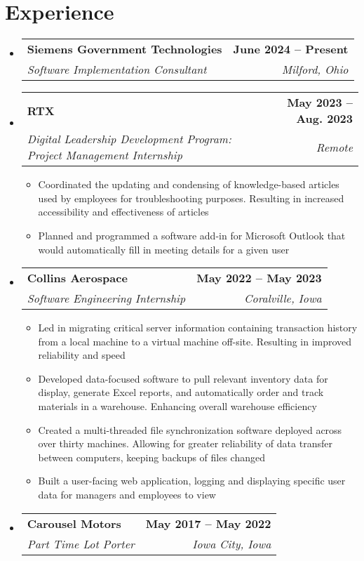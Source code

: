 \documentclass[letterpaper,11pt]{article}
\makeatletter
\newcommand{\resumeItem}[1]{
  \item\small{
    {#1 \vspace{-2pt}}
  }
}
\newcommand{\resumeSubheading}[4]{
  \vspace{-2pt}\item
    \begin{tabular*}{1.0\textwidth}[t]{l@{\extracolsep{\fill}}r}
      \textbf{#1} & \textbf{\small #2} \\
      \textit{\small#3} & \textit{\small #4} \\
    \end{tabular*}\vspace{-7pt}
}
\newcommand{\resumeSubHeadingListStart}{\begin{itemize}[leftmargin=0.0in, label={}]}
\newcommand{\resumeSubHeadingListEnd}{\end{itemize}}
\newcommand{\resumeItemListStart}{\begin{itemize}}
\newcommand{\resumeItemListEnd}{\end{itemize}\vspace{-5pt}}
\makeatother
\begin{document}
\section{Experience}
 \vspace{2pt}
  \resumeSubHeadingListStart
  \resumeSubheading
      {Siemens Government Technologies}{June 2024 -- Present}
      {Software Implementation Consultant}{Milford, Ohio}
      \vspace{4pt}
  \resumeSubheading
      {RTX}{May 2023 -- Aug. 2023}
      {Digital Leadership Development Program: Project Management Internship}{Remote}
      \resumeItemListStart
        \resumeItem{Coordinated the updating and condensing of knowledge-based articles used by employees for troubleshooting purposes. Resulting in increased accessibility and effectiveness of articles}
        \resumeItem{Planned and programmed a software add-in for Microsoft Outlook that would automatically fill in meeting details for a given user}
        \resumeItemListEnd
        \vspace{4pt}
    \resumeSubheading
      {Collins Aerospace}{May 2022 -- May 2023}
      {Software Engineering Internship}{Coralville, Iowa}
      \resumeItemListStart
        \resumeItem{Led in migrating critical server information containing transaction history from a local machine to a virtual machine off-site. Resulting in improved reliability and speed}
        \resumeItem{Developed data-focused software to pull relevant inventory data for display, generate Excel reports, and automatically order and track materials in a warehouse. Enhancing overall warehouse efficiency}
        \resumeItem{Created a multi-threaded file synchronization software deployed across over thirty machines. Allowing for greater reliability of data transfer between computers, keeping backups of files changed}
        \resumeItem{Built a user-facing web application, logging and displaying specific user data for managers and employees to view}        
        \resumeItemListEnd
        \vspace{4pt}
    \resumeSubheading
      {Carousel Motors}{May 2017 -- May 2022}
      {Part Time Lot Porter}{Iowa City, Iowa}
    \vspace{4pt}
  \resumeSubHeadingListEnd
  
\end{document}
